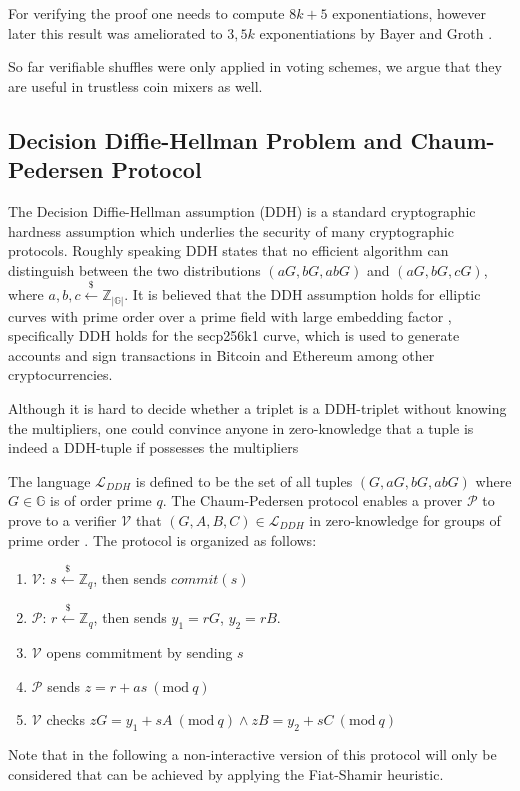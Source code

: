 \documentclass[a4paper]{article}
\theoremstyle{definition}
\newcommand{\Mod}[1]{\ (\mathrm{mod}\ #1)}
\begin{document}
For verifying the proof one needs to compute $8k+5$ exponentiations, however later this result was ameliorated to $3,5k$ exponentiations by Bayer and Groth \cite{bayer2012efficient}.

So far verifiable shuffles were only applied in voting schemes, we argue that they are useful in trustless coin mixers as well.  

\subsection{Decision Diffie-Hellman Problem and Chaum-Pedersen Protocol}

The Decision Diffie-Hellman assumption (DDH) is a standard cryptographic hardness assumption which underlies the security of many cryptographic protocols. Roughly speaking DDH states that no efficient algorithm can distinguish between the two distributions $(aG, bG, abG)$ and $(aG, bG, cG)$, where $a,b,c\stackrel{\$}{\leftarrow}\mathbb{Z}_{|\mathbb{G}|}$. It is believed that the DDH assumption holds for elliptic curves with prime order over a prime field with large embedding factor \cite{boneh1998decision}, specifically DDH holds for the secp256k1 curve, which is used to generate accounts and sign transactions in Bitcoin and Ethereum among other cryptocurrencies. 

 Although it is hard to decide whether a triplet is a DDH-triplet without knowing the multipliers, one could convince anyone in zero-knowledge that a tuple is indeed a DDH-tuple if possesses the multipliers    

The language $\mathcal{L}_{DDH}$ is defined to be the set of all tuples $(G,aG,bG,abG)$ where $G\in \mathbb{G}$ is of order prime $q$. The Chaum-Pedersen protocol enables a prover $\mathcal{P}$ to prove to a verifier $\mathcal{V}$ that $(G,A,B,C)\in\mathcal{L}_{DDH}$ in zero-knowledge for groups of prime order \cite{chaum1992wallet}. The protocol is organized as follows:

\begin{enumerate}
	\item $\mathcal{V}$: $s\stackrel{\$}{\leftarrow}\mathbb{Z}_q$, then sends $commit(s)$ 
	\item $\mathcal{P}$: $r\stackrel{\$}{\leftarrow}\mathbb{Z}_q$, then sends $y_1=rG$, $y_2=rB$.
	\item $\mathcal{V}$ opens commitment by sending $s$
	\item $\mathcal{P}$ sends $z=r+as \Mod{q}$
	\item $\mathcal{V}$ checks $zG=y_{1}+sA \Mod{q} \land zB=y_{2}+sC \Mod{q}$
\end{enumerate} 
Note that in the following a non-interactive version of this protocol will only be considered that can be achieved by applying the Fiat-Shamir heuristic. 
\end{document}
